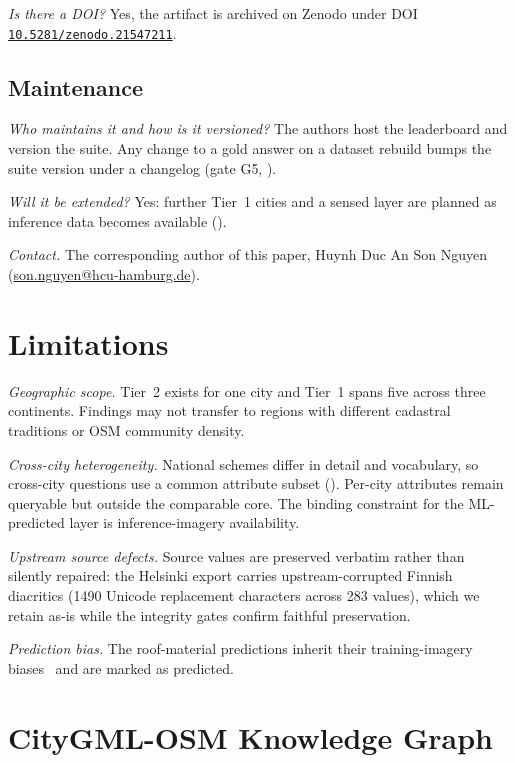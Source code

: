 \documentclass[sigconf,authordraft]{acmart}
\newcommand{\dsq}[1]{\par\smallskip\noindent\emph{#1}\space}
\begin{document}
\dsq{Is there a DOI?} Yes, the artifact is archived on Zenodo under DOI \href{https://doi.org/10.5281/zenodo.21547211}{\texttt{10.5281/zenodo.21547211}}.

\subsection{Maintenance}

\dsq{Who maintains it and how is it versioned?} The authors host the leaderboard and version the suite. Any change to a gold answer on a dataset rebuild bumps the suite version under a changelog (gate G5, ).

\dsq{Will it be extended?} Yes: further Tier~1 cities and a sensed layer are planned as inference data becomes available ().

\dsq{Contact.} The corresponding author of this paper, Huynh Duc An Son Nguyen (\href{mailto:son.nguyen@hcu-hamburg.de}{son.nguyen@hcu-hamburg.de}).

\section{Limitations}\label{sec:limitations}

\dsq{Geographic scope.} Tier~2 exists for one city and Tier~1 spans five across three continents. Findings may not transfer to regions with different cadastral traditions or OSM community density. 

\dsq{Cross-city heterogeneity.} National schemes differ in detail and vocabulary, so cross-city questions use a common attribute subset (). Per-city attributes remain queryable but outside the comparable core. The binding constraint for the ML-predicted layer is inference-imagery availability. 

\dsq{Upstream source defects.} Source values are preserved verbatim rather than silently repaired: the Helsinki export carries upstream-corrupted Finnish diacritics (\num{1490} Unicode replacement characters across \num{283} values), which we retain as-is while the integrity gates confirm faithful preservation. 

\dsq{Prediction bias.} The roof-material predictions inherit their training-imagery biases~\cite{lukas_roofmaterials} and are marked as predicted. 

\section{CityGML-OSM Knowledge Graph}\label{app:enriched_osm}
\end{document}
